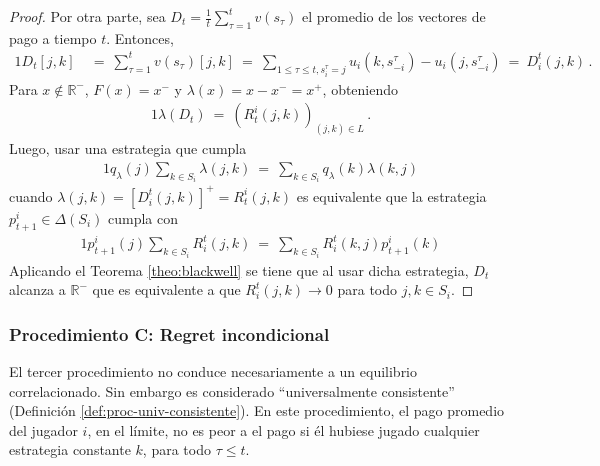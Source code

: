 \begin{proof}
Por otra parte, sea $D_t=\frac{1}{t}\sum_{\tau=1}^t v(s_\tau)$ el promedio de los vectores de pago a tiempo $t$. Entonces,
\begin{alignat}{1}
  D_t[j, k]\ &=\ \sum_{\tau=1}^{t} v(s_{\tau})[j,k]\
	=\ \sum_{1\leq\tau \leq t, s_i^{\tau} = j} u_i(k, s_{-i}^{\tau}) - u_i(j, s_{-i}^{\tau})\
	=\ D_i^t(j, k) \,.
\end{alignat}
Para $x \notin \mathbb{R}^-$, $F(x) = x^-$ y $\lambda (x) = x - x^- = x^+$, obteniendo 
\begin{alignat}{1}
	\lambda(D_t)\ =\ (R_t^i(j, k))_{(j, k) \in L} \,.
\end{alignat}
Luego, usar una estrategia que cumpla
\begin{alignat}{1}
	q_{\lambda}(j) \sum_{k \in S_i} \lambda(j, k)\ =\  \sum_{k \in S_i} q_{\lambda}(k) \lambda(k, j)
\end{alignat}
cuando $\lambda(j, k) = [D_i^t(j, k)]^+ = R_t^i(j, k)$ es equivalente que la estrategia $p_{t+1}^i \in \Delta(S_i)$ cumpla con
\begin{alignat}{1}
	p_{t+1}^i (j) \sum_{k \in S_i} R_i^t(j, k)\ =\ \sum_{k \in S_i} R_i^t(k, j) p_{t+1}^i(k)
\end{alignat}
Aplicando el Teorema \ref{theo:blackwell} se tiene que al usar dicha estrategia, $D_t$ alcanza a $\mathbb{R}^-$ que es equivalente a que $R_i^t(j, k) \rightarrow 0$ para todo $j, k \in S_i$.
\end{proof}

\subsubsection{Procedimiento C: Regret incondicional}

El tercer procedimiento no conduce necesariamente a un equilibrio correlacionado. Sin embargo es considerado ``universalmente consistente'' (Definición \ref{def:proc-univ-consistente}). En este procedimiento, el pago promedio del jugador $i$, en el límite, no es peor a el pago si él hubiese jugado cualquier estrategia constante $k$, para todo $\tau \leq t$.

